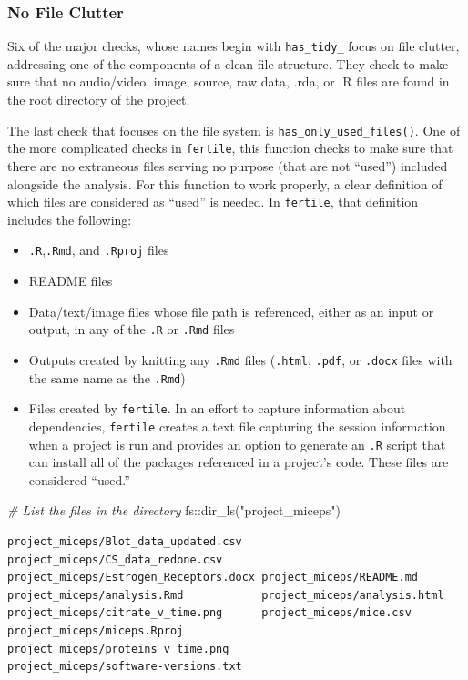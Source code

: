 \documentclass[12pt,twoside]{reedthesis}
\newenvironment{Shaded}{\begin{snugshade}}{\end{snugshade}}
\newcommand{\CommentTok}[1]{\textcolor[rgb]{0.56,0.35,0.01}{\textit{#1}}}
\newcommand{\FunctionTok}[1]{\textcolor[rgb]{0.00,0.00,0.00}{#1}}
\newcommand{\NormalTok}[1]{#1}
\newcommand{\SpecialCharTok}[1]{\textcolor[rgb]{0.00,0.00,0.00}{#1}}
\newcommand{\StringTok}[1]{\textcolor[rgb]{0.31,0.60,0.02}{#1}}
\providecommand{\tightlist}{%
  \setlength{\itemsep}{0pt}\setlength{\parskip}{0pt}}
\begin{document}
\hypertarget{no-file-clutter}{%
\subsubsection{No File Clutter}\label{no-file-clutter}}

Six of the major checks, whose names begin with \texttt{has\_tidy\_} focus on file clutter, addressing one of the components of a clean file structure. They check to make sure that no audio/video, image, source, raw data, .rda, or .R files are found in the root directory of the project.

The last check that focuses on the file system is \texttt{has\_only\_used\_files()}. One of the more complicated checks in \texttt{fertile}, this function checks to make sure that there are no extraneous files serving no purpose (that are not ``used'') included alongside the analysis. For this function to work properly, a clear definition of which files are considered as ``used'' is needed. In \texttt{fertile}, that definition includes the following:
\begin{itemize}
\tightlist
\item
  \texttt{.R},\texttt{.Rmd}, and \texttt{.Rproj} files
\item
  README files
\item
  Data/text/image files whose file path is referenced, either as an input or output, in any of the \texttt{.R} or \texttt{.Rmd} files
\item
  Outputs created by knitting any \texttt{.Rmd} files (\texttt{.html}, \texttt{.pdf}, or \texttt{.docx} files with the same name as the \texttt{.Rmd})
\item
  Files created by \texttt{fertile}. In an effort to capture information about dependencies, \texttt{fertile} creates a text file capturing the session information when a project is run and provides an option to generate an \texttt{.R} script that can install all of the packages referenced in a project's code. These files are considered ``used.''
\end{itemize}
\begin{Shaded}
\begin{Highlighting}[]
\CommentTok{\# List the files in the directory}
\NormalTok{fs}\SpecialCharTok{::}\FunctionTok{dir\_ls}\NormalTok{(}\StringTok{"project\_miceps"}\NormalTok{)}
\end{Highlighting}
\end{Shaded}
\begin{verbatim}
project_miceps/Blot_data_updated.csv   project_miceps/CS_data_redone.csv      
project_miceps/Estrogen_Receptors.docx project_miceps/README.md               
project_miceps/analysis.Rmd            project_miceps/analysis.html           
project_miceps/citrate_v_time.png      project_miceps/mice.csv                
project_miceps/miceps.Rproj            project_miceps/proteins_v_time.png     
project_miceps/software-versions.txt   
\end{verbatim}
\end{document}
